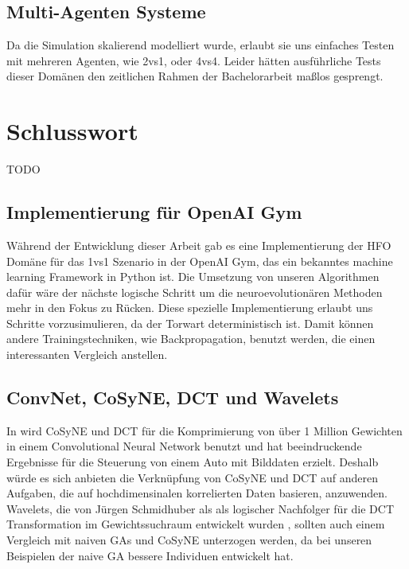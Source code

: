         \subsection*{Multi-Agenten Systeme}
            Da die Simulation skalierend modelliert wurde, erlaubt sie uns einfaches Testen mit mehreren Agenten, wie 2vs1, oder 4vs4. Leider hätten ausführliche Tests dieser Domänen den zeitlichen Rahmen der Bachelorarbeit maßlos gesprengt.

\newpage

    \section{Schlusswort}
        TODO


        \subsection*{Implementierung für OpenAI Gym}
            Während der Entwicklung dieser Arbeit gab es eine Implementierung der HFO Domäne für das 1vs1 Szenario in der OpenAI Gym, das ein bekanntes machine learning Framework in Python ist. Die Umsetzung von unseren Algorithmen dafür wäre der nächste logische Schritt um die neuroevolutionären Methoden mehr in den Fokus zu Rücken. Diese spezielle Implementierung erlaubt uns Schritte vorzusimulieren, da der Torwart deterministisch ist. Damit können andere Trainingstechniken, wie Backpropagation, benutzt werden, die einen interessanten Vergleich anstellen.

        \subsection*{ConvNet, CoSyNE, DCT und Wavelets}
            In \cite{cosyne4} wird CoSyNE und DCT für die Komprimierung von über 1 Million Gewichten in einem Convolutional Neural Network benutzt und hat beeindruckende Ergebnisse für die Steuerung von einem Auto mit Bilddaten erzielt. Deshalb würde es sich anbieten die Verknüpfung von CoSyNE und DCT auf anderen Aufgaben, die auf hochdimensinalen korrelierten Daten basieren, anzuwenden. \\

            \noindent
            Wavelets, die von Jürgen Schmidhuber als als logischer Nachfolger für die DCT Transformation im Gewichtssuchraum entwickelt wurden \cite{wavelet}, sollten auch einem Vergleich mit naiven GAs und CoSyNE unterzogen werden, da bei unseren Beispielen der naive GA bessere Individuen entwickelt hat.


